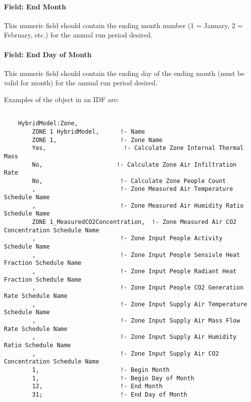 \paragraph{Field: End Month}\label{field-end-month-hm}
This numeric field should contain the ending month number (1 = January, 2 = February, etc.) for the annual run period desired.

\paragraph{Field: End Day of Month}\label{field-end-day-of-month-hm}
This numeric field should contain the ending day of the ending month (must be valid for month) for the annual run period desired.

Examples of the object in an IDF are:

\begin{lstlisting}
    
    HybridModel:Zone,
        ZONE 1 HybridModel,      !- Name
        ZONE 1,                  !- Zone Name
        Yes,                      !- Calculate Zone Internal Thermal Mass
        No,                     !- Calculate Zone Air Infiltration Rate
        No,                      !- Calculate Zone People Count
        ,                        !- Zone Measured Air Temperature Schedule Name
        ,                        !- Zone Measured Air Humidity Ratio Schedule Name
        ZONE 1_MeasuredCO2Concentration,  !- Zone Measured Air CO2 Concentration Schedule Name
        ,                        !- Zone Input People Activity Schedule Name
        ,                        !- Zone Input People Sensivle Heat Fraction Schedule Name
        ,                        !- Zone Input People Radiant Heat Fraction Schedule Name
        ,                        !- Zone Input People CO2 Generation Rate Schedule Name
        ,                        !- Zone Input Supply Air Temperature Schedule Name
        ,                        !- Zone Input Supply Air Mass Flow Rate Schedule Name
        ,                        !- Zone Input Supply Air Humidity Ratio Schedule Name
        ,                        !- Zone Input Supply Air CO2 Concentration Schedule Name
        1,                       !- Begin Month
        1,                       !- Begin Day of Month
        12,                      !- End Month
        31;                      !- End Day of Month



\end{lstlisting}
